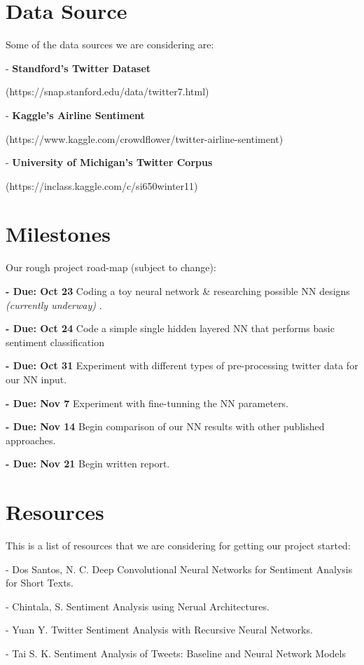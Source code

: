 \documentclass[]{article}
\begin{document}
\pagebreak
 
\section{Data Source}
Some of the data sources we are considering are:
\par - \textbf{Standford's Twitter Dataset} 
\par (https://snap.stanford.edu/data/twitter7.html)
\par - \textbf{Kaggle's Airline Sentiment}
\par (https://www.kaggle.com/crowdflower/twitter-airline-sentiment)
\par - \textbf{University of Michigan's Twitter Corpus}
\par (https://inclass.kaggle.com/c/si650winter11)
\section{Milestones}
Our rough project road-map (subject to change):
\par \textbf{- Due: Oct 23} Coding a toy neural network \& researching possible NN designs \textit{(currently underway)} .
\par \textbf{- Due: Oct 24} Code a simple single hidden layered NN that performs basic sentiment classification
\par \textbf{- Due: Oct 31} Experiment with different types of pre-processing twitter data for our NN input.
\par \textbf{- Due: Nov 7} Experiment with fine-tunning the NN parameters. 
\par \textbf{- Due: Nov 14} Begin comparison of our NN results with other published approaches. 
\par \textbf{- Due: Nov 21} Begin written report.

\section{Resources}
This is a list of resources that we are considering for getting our project started:
\par - Dos Santos, N. C. Deep Convolutional Neural Networks for Sentiment Analysis for Short Texts.
\par - Chintala, S. Sentiment Analysis using Nerual Architectures.
\par - Yuan Y. Twitter Sentiment Analysis with Recursive Neural Networks.
\par - Tai S. K. Sentiment Analysis of Tweets: Baseline and Neural Network Models
\end{document}
